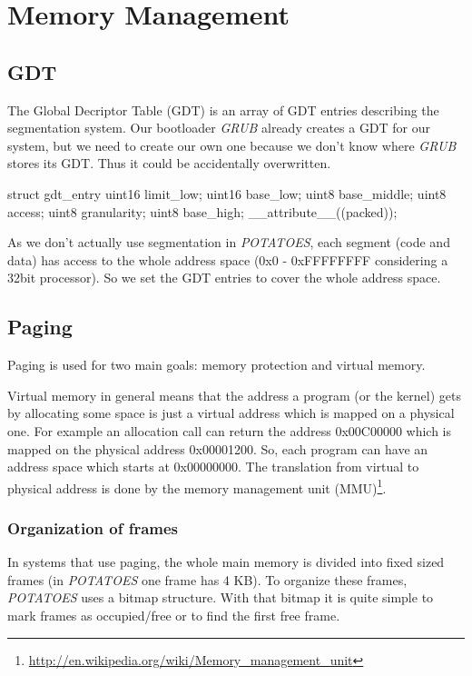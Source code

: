 \documentclass[11pt,a4paper]{scrartcl}
\begin{document}
\section{Memory Management}

\subsection{GDT}
The Global Decriptor Table (GDT) is an array of GDT entries describing the segmentation system.
Our bootloader \textit{GRUB} already creates a GDT for our system, but we need to create our own one because we don't know where \textit{GRUB} stores its GDT. Thus it could be accidentally overwritten.\\

\begin{code}[kernel/mm/mm.h]
struct gdt_entry {
	uint16 limit_low;
	uint16 base_low;
	uint8  base_middle;
	uint8  access;
	uint8  granularity;
	uint8  base_high;
} __attribute__((packed));
\end{code}
As we don't actually use segmentation in \textit{POTATOES}, each segment (code and data) has access to the whole address space (0x0 - 0xFFFFFFFF considering a 32bit processor). So we set the GDT entries to cover the whole address space.

\subsection{Paging}
Paging is used for two main goals: memory protection and virtual memory.

Virtual memory in general means that the address a program (or the kernel) gets by allocating some space is just a virtual address which is mapped on a physical one. For example an allocation call can return the address 0x00C00000 which is mapped on the physical address 0x00001200. So, each program can have an address space which starts at 0x00000000. The translation from virtual to physical address is done by the memory management unit (MMU)\footnote{\url{http://en.wikipedia.org/wiki/Memory_management_unit}}.
\subsubsection{Organization of frames}
In systems that use paging, the whole main memory is divided into fixed sized frames (in \textit{POTATOES} one frame has 4 KB).
To organize these frames, \textit{POTATOES} uses a bitmap structure. With that bitmap it is quite simple to mark frames as occupied/free or to find the first free frame.
\end{document}
